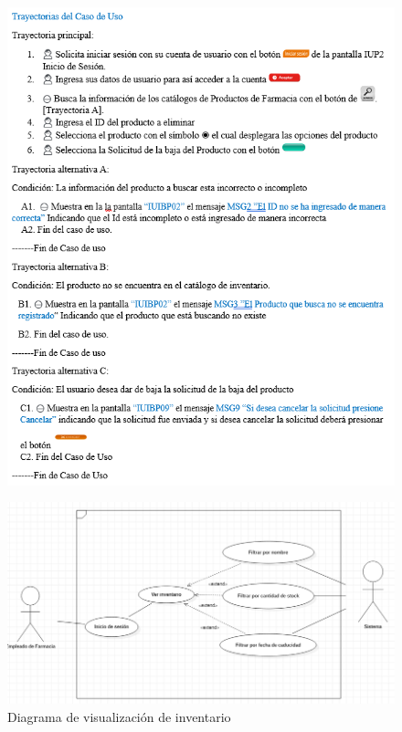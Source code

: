 \documentclass[12pt,letterpaper]{article}
\begin{document}
{\begin{figure}[H]
        \end{figure}
        \begin{figure}[H]
            \centering
            \includegraphics [scale=0.9]{trayectoriaBajaMedicamento}
        \end{figure}
        \begin{figure}[H]
            \centering
            \includegraphics [scale=0.5]{verInventario}
            \caption{Diagrama de visualización de inventario}

\end{figure}}
\end{document}
